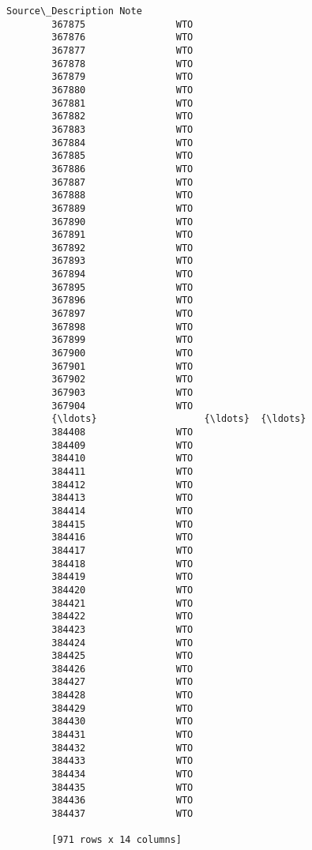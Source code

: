 \documentclass[11pt]{article}
\begin{document}
\begin{Verbatim}[commandchars=\\\{\}]
               Source\_Description Note  
        367875                WTO       
        367876                WTO       
        367877                WTO       
        367878                WTO       
        367879                WTO       
        367880                WTO       
        367881                WTO       
        367882                WTO       
        367883                WTO       
        367884                WTO       
        367885                WTO       
        367886                WTO       
        367887                WTO       
        367888                WTO       
        367889                WTO       
        367890                WTO       
        367891                WTO       
        367892                WTO       
        367893                WTO       
        367894                WTO       
        367895                WTO       
        367896                WTO       
        367897                WTO       
        367898                WTO       
        367899                WTO       
        367900                WTO       
        367901                WTO       
        367902                WTO       
        367903                WTO       
        367904                WTO       
        {\ldots}                   {\ldots}  {\ldots}  
        384408                WTO       
        384409                WTO       
        384410                WTO       
        384411                WTO       
        384412                WTO       
        384413                WTO       
        384414                WTO       
        384415                WTO       
        384416                WTO       
        384417                WTO       
        384418                WTO       
        384419                WTO       
        384420                WTO       
        384421                WTO       
        384422                WTO       
        384423                WTO       
        384424                WTO       
        384425                WTO       
        384426                WTO       
        384427                WTO       
        384428                WTO       
        384429                WTO       
        384430                WTO       
        384431                WTO       
        384432                WTO       
        384433                WTO       
        384434                WTO       
        384435                WTO       
        384436                WTO       
        384437                WTO       
        
        [971 rows x 14 columns]
\end{Verbatim}
            
\end{document}
